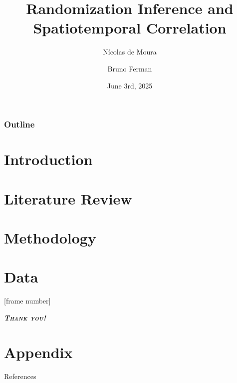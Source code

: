 \documentclass[compress,sans,12pt,aspectratio=169]{beamer}
\title{\textbf{Randomization Inference and Spatiotemporal Correlation}}
\date{June 3rd, 2025}
\author{Nícolas de Moura \inst{\textdagger} \and Bruno Ferman \inst{\textdagger}}
\institute{\inst{\textdagger} São Paulo School of Economics - FGV/EESP}
\newcommand{\textdest}[1]{\textbf{\textit{\textsc{#1}}}}
\begin{document}
\frame[plain]{\titlepage}

    \begin{frame}[plain]
        \frametitle{Outline}
        \tableofcontents
    \end{frame}

    \section{Introduction}
    

    \section{Literature Review}
    

    \section{Methodology}
    

    \section{Data}
    

\End

[frame number]


\begin{frame}
      \centering\LARGE{\textdest{Thank you!}}
\end{frame}


\appendix
\section{Appendix}


\begin{frame}[allowframebreaks]{References}
    
\end{frame}
\end{document}
